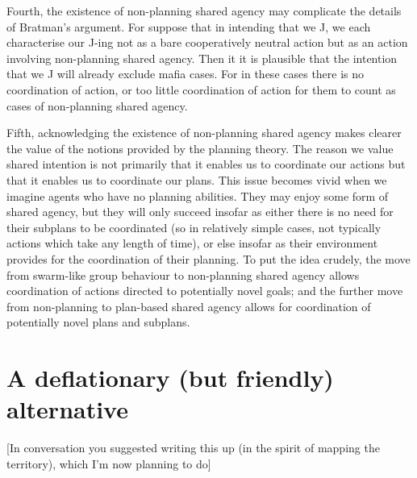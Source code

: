 \documentclass[12pt,letterpaper]{extarticle}
\begin{document}
Fourth, the existence of non-planning shared agency may complicate the details of Bratman's argument.
For suppose that in intending that we J, we each characterise our J-ing not as a bare cooperatively neutral action but as an action involving non-planning shared agency.
Then it it is plausible that the intention that we J will already exclude mafia cases.
For in these cases there is no coordination of action, or too little coordination of action for them to count as cases of non-planning shared agency.

Fifth, acknowledging the existence of non-planning shared agency makes clearer the value of the notions provided by the planning theory.
The reason we value shared intention is not primarily that it enables us to coordinate our actions but that it enables us to coordinate our plans.
This issue becomes vivid when we imagine agents who have no planning abilities.
They may enjoy some form of shared agency, but they will only succeed insofar as either there is no need for their subplans to be coordinated (so in relatively simple cases, not typically actions which take any length of time), or else insofar as their environment provides for the coordination of their planning.
To put the idea crudely, the move from swarm-like group behaviour to non-planning shared agency allows coordination of actions directed to potentially novel goals; and the further move from non-planning to plan-based shared agency allows for coordination of potentially novel plans and subplans.





\section{A deflationary (but friendly) alternative}
\label{deflationary}

[In conversation you suggested writing this up (in the spirit of mapping the territory), which I'm now planning to do]
\end{document}
